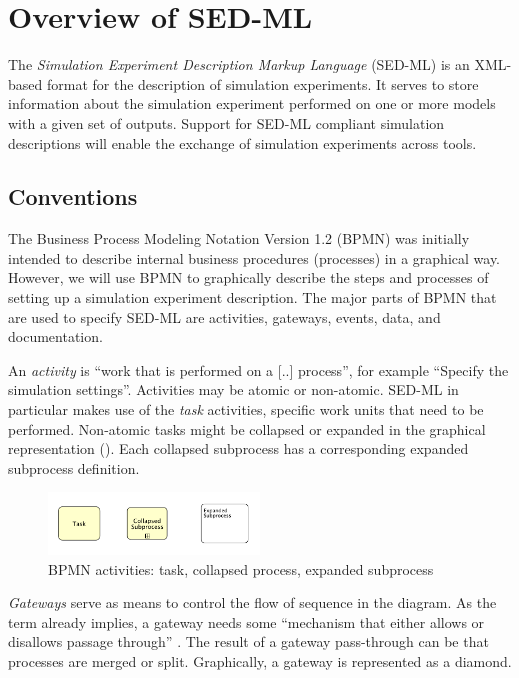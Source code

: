 \section{Overview of SED-ML}
\label{sec:overview}
The \emph{Simulation Experiment Description Markup Language} (SED-ML) is an XML-based format for the description of simulation experiments. It serves to store information about the simulation experiment performed on one or more models with a given set of outputs. Support for SED-ML compliant simulation descriptions will enable the exchange of simulation experiments across tools.
\subsection{Conventions}
%
The Business Process Modeling Notation Version 1.2 (BPMN) was initially intended to describe internal business procedures (processes) in a graphical way. However, we will use BPMN to graphically describe the steps and processes of setting up a simulation experiment description. The major parts of BPMN that are used to specify SED-ML are activities, gateways, events, data, and documentation. 

An \emph{activity} is ``work that is performed on a [..] process'', for example ``Specify the simulation settings''. Activities may be atomic or non-atomic. SED-ML in particular makes use of the \emph{task} activities, \ie specific work units that need to be performed. Non-atomic tasks might be collapsed or expanded in the graphical representation (). Each collapsed subprocess has a corresponding expanded subprocess definition.

\begin{figure}[h]
\centering
\includegraphics[width=0.5\textwidth]{images/processes.pdf}
\caption{BPMN activities: task, collapsed process, expanded subprocess}
\label{fig:task}
\end{figure}

\emph{Gateways} serve as means to control the flow of sequence in the diagram. As the term already implies, a gateway needs some ``mechanism that either allows or disallows passage through'' \citep{White:2004}. The result of a gateway pass-through can be that processes are merged or split. Graphically, a gateway is represented as a diamond. 

